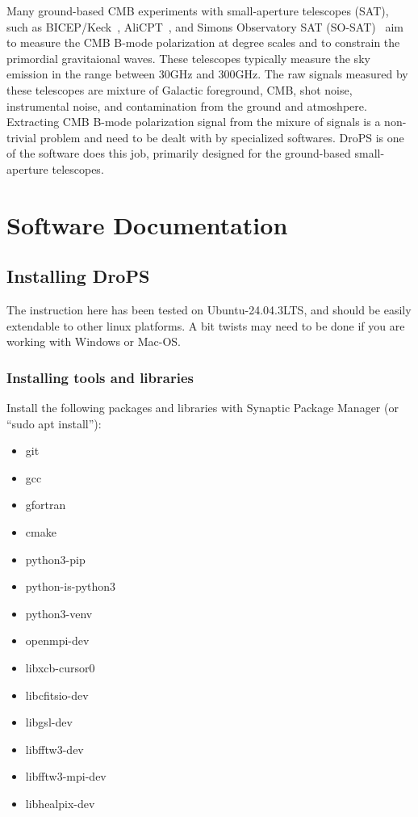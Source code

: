 \documentclass[12pt, a4paper]{ctexart} %
\begin{document}
Many ground-based CMB experiments with small-aperture telescopes (SAT), such as BICEP/Keck~\cite{BICEP}, AliCPT~\cite{AliCPT}, and Simons Observatory SAT (SO-SAT)~\cite{SO-SAT} aim to measure the CMB B-mode polarization at degree scales and to constrain the primordial gravitaional waves. These telescopes typically measure the sky emission in the range between $30\mathrm{GHz}$ and $300\mathrm{GHz}$. The raw signals measured by these telescopes are mixture of Galactic foreground, CMB, shot noise, instrumental noise, and contamination from the ground and atmoshpere. Extracting CMB B-mode polarization signal from the mixure of signals is a non-trivial problem and need to be dealt with by specialized softwares. DroPS is one of the software does this job, primarily designed for the ground-based small-aperture telescopes.

\section{Software Documentation}


\subsection{Installing DroPS}

The instruction here has been tested on Ubuntu-24.04.3LTS, and should be easily extendable to other linux platforms. A bit twists may need to be done if you are working with Windows or Mac-OS.

\subsubsection{Installing tools and libraries}

Install the following packages and libraries with Synaptic Package Manager (or ``sudo apt install''):

\begin{itemize}
  \item{git}
  \item{gcc}
  \item{gfortran}
  \item{cmake}
  \item{python3-pip}
  \item{python-is-python3}
  \item{python3-venv}
  \item{openmpi-dev}
  \item{libxcb-cursor0}
  \item{libcfitsio-dev}
  \item{libgsl-dev}
  \item{libfftw3-dev}
  \item{libfftw3-mpi-dev}
  \item{libhealpix-dev}
\end{itemize}
\end{document}
